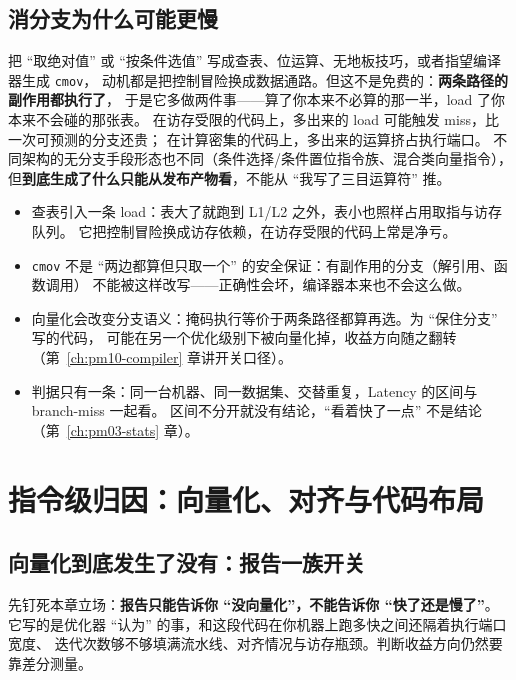 \documentclass[12pt,a4paper,fontset=fandol]{ctexbook}
\newcommand{\Tp}[1]{\texttt{#1}}
\newcommand{\Bk}{\discretionary{}{}{}}
\newcommand{\Lang}[1]{\textsf{#1}}
\newcommand{\MLat}{\Lang{Latency}}
\newcommand{\Mx}[1]{\textsf{#1}}
\begin{document}
\subsection{消分支为什么可能更慢}

把 ``取绝对值'' 或 ``按条件选值'' 写成查表、位运算、无地板技巧，或者指望编译器生成 \Tp{cmov}，
动机都是把控制冒险换成数据通路。但这不是免费的：\textbf{两条路径的副作用都执行了}，
于是它多做两件事——算了你本来不必算的那一半，load 了你本来不会碰的那张表。
在访存受限的代码上，多出来的 load 可能触发 miss，比一次可预测的分支还贵；
在计算密集的代码上，多出来的运算挤占执行端口。
不同架构的无分支手段形态也不同（条件选择/条件置位指令族、混合类向量指令），
但\textbf{到底生成了什么只能从发布产物看}，不能从 ``我写了三目运算符'' 推。

\begin{warning}[title={``把分支改成查表必然快''},label={box:pm06-brwarn}]
\begin{itemize}
\item 查表引入一条 load：表大了就跑到 L1/L2 之外，表小也照样占用取指与访存队列。
  它把控制冒险换成访存依赖，在访存受限的代码上常是净亏。
\item \Tp{cmov} 不是 ``两边都算但只取一个'' 的安全保证：有副作用的分支（解引用、函数调用）
  不能被这样改写——正确性会坏，编译器本来也不会这么做。
\item 向量化会改变分支语义：掩码执行等价于两条路径都算再选。为 ``保住分支'' 写的代码，
  可能在另一个优化级别下被向量化掉，收益方向随之翻转（第~\ref{ch:pm10-compiler} 章讲开关口径）。
\item 判据只有一条：同一台机器、同一数据集、交替重复，\MLat{} 的区间与 \Mx{branch{\Bk}-miss} 一起看。
  区间不分开就没有结论，``看着快了一点'' 不是结论（第~\ref{ch:pm03-stats} 章）。
\end{itemize}
\end{warning}

\section{指令级归因：向量化、对齐与代码布局}
\label{sec:pm06-vec}

\subsection{向量化到底发生了没有：报告一族开关}

先钉死本章立场：\textbf{报告只能告诉你 ``没向量化''，不能告诉你 ``快了还是慢了''}。
它写的是优化器 ``认为'' 的事，和这段代码在你机器上跑多快之间还隔着执行端口宽度、
迭代次数够不够填满流水线、对齐情况与访存瓶颈。判断收益方向仍然要靠差分测量。
\end{document}
